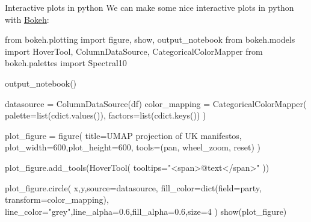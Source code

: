\documentclass[
  10pt,
  ignorenonframetext,
  aspectratio=169]{beamer}
\newenvironment{Shaded}{\begin{snugshade}}{\end{snugshade}}
\newcommand{\BuiltInTok}[1]{\textcolor[rgb]{0.80,0.80,0.80}{#1}}
\newcommand{\DecValTok}[1]{\textcolor[rgb]{0.86,0.86,0.80}{#1}}
\newcommand{\FloatTok}[1]{\textcolor[rgb]{0.75,0.75,0.82}{#1}}
\newcommand{\ImportTok}[1]{\textcolor[rgb]{0.80,0.80,0.80}{#1}}
\newcommand{\NormalTok}[1]{\textcolor[rgb]{0.80,0.80,0.80}{#1}}
\newcommand{\OperatorTok}[1]{\textcolor[rgb]{0.94,0.94,0.82}{#1}}
\newcommand{\StringTok}[1]{\textcolor[rgb]{0.80,0.58,0.58}{#1}}
\begin{document}
\begin{frame}[fragile]{Interactive plots in python}
\protect\hypertarget{interactive-plots-in-python}{}
We can make some nice interactive plots in python with
\href{https://docs.bokeh.org/en/latest/index.html}{Bokeh}:

\tiny

\begin{Shaded}
\begin{Highlighting}[]
\ImportTok{from}\NormalTok{ bokeh.plotting }\ImportTok{import}\NormalTok{ figure, show, output\_notebook}
\ImportTok{from}\NormalTok{ bokeh.models }\ImportTok{import}\NormalTok{ HoverTool, ColumnDataSource, CategoricalColorMapper}
\ImportTok{from}\NormalTok{ bokeh.palettes }\ImportTok{import}\NormalTok{ Spectral10}

\NormalTok{output\_notebook()}

\NormalTok{datasource }\OperatorTok{=}\NormalTok{ ColumnDataSource(df)}
\NormalTok{color\_mapping }\OperatorTok{=}\NormalTok{ CategoricalColorMapper(}
\NormalTok{    palette}\OperatorTok{=}\BuiltInTok{list}\NormalTok{(cdict.values()),}
\NormalTok{    factors}\OperatorTok{=}\BuiltInTok{list}\NormalTok{(cdict.keys())}
\NormalTok{)}

\NormalTok{plot\_figure }\OperatorTok{=}\NormalTok{ figure(}
\NormalTok{    title}\OperatorTok{=}\StringTok{\textquotesingle{}UMAP projection of UK manifestos\textquotesingle{}}\NormalTok{,}
\NormalTok{    plot\_width}\OperatorTok{=}\DecValTok{600}\NormalTok{,plot\_height}\OperatorTok{=}\DecValTok{600}\NormalTok{,}
\NormalTok{    tools}\OperatorTok{=}\NormalTok{(}\StringTok{\textquotesingle{}pan, wheel\_zoom, reset\textquotesingle{}}\NormalTok{)}
\NormalTok{)}

\NormalTok{plot\_figure.add\_tools(HoverTool(}
\NormalTok{    tooltips}\OperatorTok{=}\StringTok{"\textless{}span\textgreater{}@text\textless{}/span\textgreater{}"}
\NormalTok{))}

\NormalTok{plot\_figure.circle(}
    \StringTok{\textquotesingle{}x\textquotesingle{}}\NormalTok{,}\StringTok{\textquotesingle{}y\textquotesingle{}}\NormalTok{,source}\OperatorTok{=}\NormalTok{datasource,}
\NormalTok{    fill\_color}\OperatorTok{=}\BuiltInTok{dict}\NormalTok{(field}\OperatorTok{=}\StringTok{\textquotesingle{}party\textquotesingle{}}\NormalTok{, transform}\OperatorTok{=}\NormalTok{color\_mapping),}
\NormalTok{    line\_color}\OperatorTok{=}\StringTok{"grey"}\NormalTok{,line\_alpha}\OperatorTok{=}\FloatTok{0.6}\NormalTok{,fill\_alpha}\OperatorTok{=}\FloatTok{0.6}\NormalTok{,size}\OperatorTok{=}\DecValTok{4}
\NormalTok{)}
\NormalTok{show(plot\_figure)}
\end{Highlighting}
\end{Shaded}
\end{frame}
\end{document}
